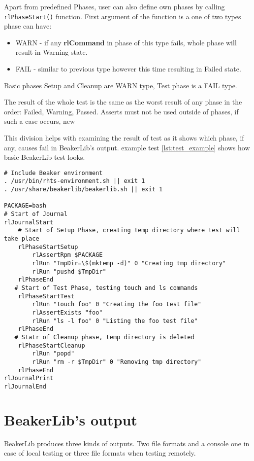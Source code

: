 Apart from predefined Phases, user can also define own phases by calling \texttt{rlPhaseStart()} function. First argument of the function is a one of two types phase can have:

\begin{itemize}
\item WARN - if any \textbf{rlCommand} in phase of this type fails, whole phase will result in Warning state.
\item FAIL - similar to previous type however this time resulting in Failed state.
\end{itemize}

Basic phases Setup and Cleanup are WARN type, Test phase is a FAIL type.

The result of the whole test is the same as the worst result of any phase in the order: Failed, Warning, Passed.
Asserts must not be used outside of phases, if such a case occurs, new  

This division helps with examining the result of test as it shows which phase, if any, causes fail in BeakerLib's output. 
example test \ref{lst:test_example} shows how basic BeakerLib test looks.
\\
\begin{lstlisting}[style=beakerlib_bash,caption={BeakerLib basic test example},label={lst:test_example}]
# Include Beaker environment
. /usr/bin/rhts-environment.sh || exit 1
. /usr/share/beakerlib/beakerlib.sh || exit 1

PACKAGE=bash
# Start of Journal
rlJournalStart
    # Start of Setup Phase, creating temp directory where test will take place 
    rlPhaseStartSetup
        rlAssertRpm $PACKAGE
        rlRun "TmpDir=\$(mktemp -d)" 0 "Creating tmp directory"
        rlRun "pushd $TmpDir"
    rlPhaseEnd
   # Start of Test Phase, testing touch and ls commands
    rlPhaseStartTest
        rlRun "touch foo" 0 "Creating the foo test file"
        rlAssertExists "foo"
        rlRun "ls -l foo" 0 "Listing the foo test file"
    rlPhaseEnd
   # Statr of Cleanup phase, temp directory is deleted
    rlPhaseStartCleanup
        rlRun "popd"
        rlRun "rm -r $TmpDir" 0 "Removing tmp directory"
    rlPhaseEnd
rlJournalPrint
rlJournalEnd
\end{lstlisting}

\section{BeakerLib's output}
BeakerLib produces three kinds of outputs. Two file formats and a console one in case of local testing or three file formats when testing remotely.

